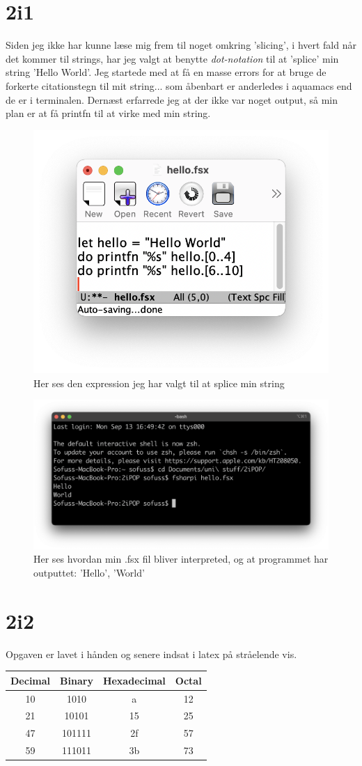 \documentclass[12pt,a4paper]{article}
\begin{document}
\section*{2i1}
Siden jeg ikke har kunne læse mig frem til noget omkring 'slicing', i hvert fald når det kommer til strings, har jeg valgt at benytte \textit{dot-notation} til at 'splice' min string 'Hello World'.
Jeg startede med at få en masse errors for at bruge de forkerte citationstegn til mit string... som åbenbart er anderledes i aquamacs end de er i terminalen.
Dernæst erfarrede jeg at der ikke var noget output, så min plan er at få printfn til at virke med min string.
\begin{figure}[H]
    \centering
    \includegraphics[width=0.5\linewidth]{Aqua.png}
    \caption{Her ses den expression jeg har valgt til at splice min string}
    \label{fig:1}
\end{figure}
\begin{figure}[H]
    \centering
    \includegraphics[width=0.5\linewidth]{Term.png}
    \caption{Her ses hvordan min .fsx fil bliver interpreted, og at programmet har outputtet: 'Hello', 'World'}
    \label{fig:2}
\end{figure}

\section*{2i2}

Opgaven er lavet i hånden og senere indsat i latex på stråelende vis.
\begin{table}[H]
\begin{center}
\begin{tabular}{|c|c|c|c|}
\hline
Decimal & Binary & Hexadecimal & Octal \\ \hline
10      & 1010   & a           & 12    \\ \hline
21      & 10101  & 15          & 25    \\ \hline
47      & 101111 & 2f          & 57    \\ \hline
59      & 111011 & 3b          & 73    \\ \hline
\end{tabular}
\end{center}
\end{table}
\end{document}
